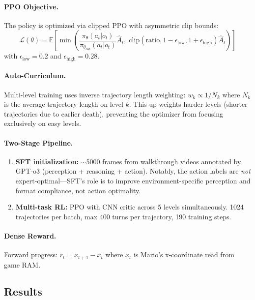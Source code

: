 \documentclass[11pt]{article}
\begin{document}
\paragraph{PPO Objective.}
The policy is optimized via clipped PPO with asymmetric clip bounds:
\begin{equation}
    \mathcal{L}(\theta) = \mathbb{E}\!\left[\min\!\left(\frac{\pi_\theta(a_t | o_t)}{\pi_{\theta_{\mathrm{old}}}(a_t | o_t)} \hat{A}_t,\; \mathrm{clip}(\mathrm{ratio}, 1 - \epsilon_{\mathrm{low}}, 1 + \epsilon_{\mathrm{high}}) \hat{A}_t\right)\right]
\end{equation}
with $\epsilon_{\mathrm{low}} = 0.2$ and $\epsilon_{\mathrm{high}} = 0.28$.

\paragraph{Auto-Curriculum.}
Multi-level training uses inverse trajectory length weighting: $w_k \propto 1/N_k$ where $N_k$ is the average trajectory length on level $k$. This up-weights harder levels (shorter trajectories due to earlier death), preventing the optimizer from focusing exclusively on easy levels.

\paragraph{Two-Stage Pipeline.}
\begin{enumerate}
    \item \textbf{SFT initialization:} $\sim$5000 frames from walkthrough videos annotated by GPT-o3 (perception + reasoning + action). Notably, the action labels are \emph{not} expert-optimal---SFT's role is to improve environment-specific perception and format compliance, not action optimality.
    \item \textbf{Multi-task RL:} PPO with CNN critic across 5 levels simultaneously. 1024 trajectories per batch, max 400 turns per trajectory, 190 training steps.
\end{enumerate}

\paragraph{Dense Reward.}
Forward progress: $r_t = x_{t+1} - x_t$ where $x_t$ is Mario's x-coordinate read from game RAM.

\subsection{Results}
\end{document}
